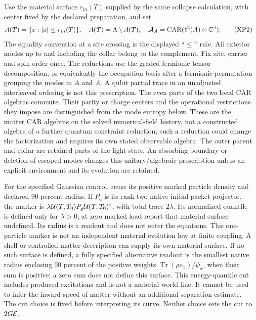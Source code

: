\documentclass[11pt]{article}
\DeclareMathOperator{\Tr}{Tr}
\DeclareMathOperator{\CAR}{CAR}
\begin{document}
Use the material surface $r_m(T)$ supplied by the same collapse
calculation, with center fixed by the declared preparation, and set
\begin{equation}
 A(T)=\{x:|x|\leq r_m(T)\},\quad
 \bar A(T)=\Lambda\setminus A(T),\quad
 {\cal A}_{A}=\CAR(\ell^2(A)\otimes{\mathbb C}^4).
 \tag{XP2}
\end{equation}
The equality convention at a site crossing is the displayed
``$\leq$'' rule.  All exterior modes up to and including the collar
belong to the complement.  Fix site, carrier and spin order once.
The reductions use the graded fermionic tensor decomposition, or
equivalently the occupation basis after a fermionic permutation
grouping the modes in $A$ and $\bar A$.  A qubit partial trace in an
unadjusted interleaved ordering is not this prescription.
The even parts of the two local CAR algebras commute.
Their parity or charge centers and the operational restrictions
they impose are distinguished from the mode entropy below.
These are the matter CAR algebras on the solved numerical-field
history, not a constructed algebra of a further quantum
constraint reduction; such a reduction could change the
factorization and requires its own stated observable algebra.
The outer parent and collar are retained parts of the light state.
An absorbing boundary or deletion of escaped modes changes this
unitary/algebraic prescription unless an explicit environment and
its evolution are retained.

For the specified Gaussian control, reuse its positive marked
particle density and declared 90-percent radius.  If
$P_g$ is its rank-two native initial packet projector, the marker
is $\lambda{\cal U}(T,T_0)P_g{\cal U}(T,T_0)^\dagger$,
with total trace $2\lambda$.  Its normalized quantile is defined
only for $\lambda>0$; at zero marked load report that material
surface undefined.  Its radius is a readout and does not enter
the equations.
This one-particle marker is not an independent material evolution
law at finite coupling.  A shell or controlled matter description
can supply its own material surface.  If no such surface is defined,
a fully specified alternative readout is the smallest native radius
enclosing 90 percent of the positive weights
$\Tr(\rho e_x)/\psi_x$, when their sum is positive; a zero sum
does not define this surface.  This energy-quantile cut includes produced
excitations and is not a material world line.  It cannot be used
to infer the inward speed of matter without an additional separation
estimate.  The cut choice is fixed before interpreting its curve.
Neither choice sets the cut to $2G{\cal E}$.
\end{document}
